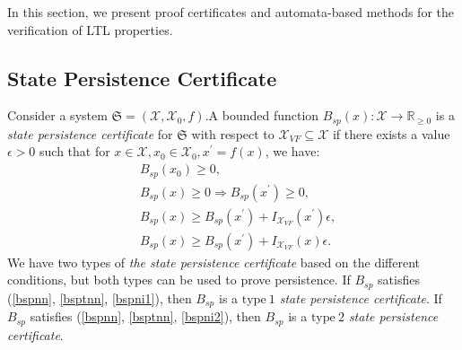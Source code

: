 In this section, we present proof certificates and automata-based methods for the verification of LTL properties.




\subsection{State Persistence Certificate}

\begin{definition}
  \label{systempc}
  Consider a system $\mathfrak{S} = (\mathcal{X}, \mathcal{X}_0, f)$.A bounded function $B_{sp}(x): \mathcal{X} \rightarrow \mathbb{R}_{\geq 0}$ is a \emph{state persistence certificate} for $\mathfrak{S}$ with respect to $\mathcal{X}_{VF} \subseteq \mathcal{X}$ if there exists a value $\epsilon > 0$ such that for $x \in \mathcal{X}, x_0 \in \mathcal{X}_0, x^{\prime} = f(x)$, we have:\\
  \begin{align}
    &B_{sp}(x_0) \geq 0, \label{bspnn} \\
    &B_{sp}(x) \geq 0 \Rightarrow B_{sp}(x^{\prime}) \geq 0, \label{bsptnn} \\
    &B_{sp}(x) \geq B_{sp}(x^{\prime}) + I_{\mathcal{X}_{VF}}(x^{\prime})\epsilon, \label{bspni1}\\
    &B_{sp}(x) \geq B_{sp}(x^{\prime}) + I_{\mathcal{X}_{VF}}(x)\epsilon. \label{bspni2}
  \end{align}
  We have two types of \emph{the state persistence certificate} based on the different conditions, but both types can be used to prove persistence.
  If $B_{sp}$ satisfies (\ref{bspnn}, \ref{bsptnn}, \ref{bspni1}), then $B_{sp}$ is a \emph{$\mathrm{type~1}$ state persistence certificate}. If $B_{sp}$ satisfies (\ref{bspnn}, \ref{bsptnn}, \ref{bspni2}), then $B_{sp}$ is a \emph{$\mathrm{type~2}$ state persistence certificate}.
\end{definition}

